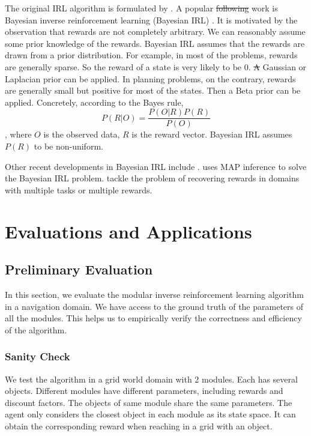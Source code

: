 \documentclass[12pt]{report}	%
\theoremstyle{definition}
\theoremstyle{remark}
\providecommand{\DIFadd}[1]{{\protect\color{blue}\uwave{#1}}} %
\providecommand{\DIFdel}[1]{{\protect\color{red}\sout{#1}}}                      %
\providecommand{\DIFaddbegin}{} %
\providecommand{\DIFaddend}{} %
\providecommand{\DIFdelbegin}{} %
\providecommand{\DIFdelend}{} %
\begin{document}
The original IRL algorithm is formulated by
\cite{abbeel2004apprenticeship,ng2000algorithms}. A popular \DIFdelbegin \DIFdel{following }\DIFdelend \DIFaddbegin \DIFadd{subsequent }\DIFaddend work is
Bayesian inverse reinforcement learning (Bayesian IRL) \cite{ramachandran2007bayesian}.
It is motivated by the
observation that rewards are not completely arbitrary. We can reasonably assume
some prior knowledge of the rewards. Bayesian IRL assumes that the rewards are
drawn from a prior distribution. 
For example, in most of the problems, rewards are generally sparse. So the
reward of a state is very likely to be 0. \DIFdelbegin \DIFdel{A }\DIFdelend \DIFaddbegin \DIFadd{So a }\DIFaddend Gaussian or Laplacian prior can be
applied.  In planning problems, on the contrary, rewards are generally small but
positive for most of the states. Then a Beta prior can be applied.
Concretely, according to the Bayes rule,
$$P(R|O) = \frac{P(O|R)P(R)}{P(O)}$$
, where $O$ is the observed data, $R$ is the reward vector. Bayesian IRL assumes
$P(R)$ to be non-uniform.

Other recent developments in Bayesian IRL include
\cite{choi2011map,choi2012nonparametric,dimitrakakis2012bayesian}.
\cite{choi2011map} uses MAP inference to solve the Bayesian IRL problem.
\cite{choi2012nonparametric,dimitrakakis2012bayesian} tackle the problem of
recovering rewards in domains with multiple tasks or multiple rewards. 


\chapter{Evaluations and Applications}
\label{chp:eval}
\section{Preliminary Evaluation}

In this section, we evaluate the modular inverse reinforcement learning
algorithm in a navigation domain. We have access to the ground truth of the
parameters of all the modules. This helps us to empirically verify the
correctness and efficiency of the algorithm.

\subsection{Sanity Check}

We test the algorithm in a grid world domain with 2 modules. Each has several
objects. Different modules have different parameters, including rewards and discount
factors. The objects of same module share the same parameters. The agent only
considers the closest object in each module as its state space. It can
obtain the corresponding reward when reaching in a grid with an object.
\end{document}
